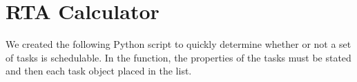 
\section{RTA Calculator} %
We created the following Python script to quickly determine whether or not a set of tasks is schedulable. In the  function, the properties of the tasks must be stated and then each task object placed in the  list.
\label{cha:rta_calculator}

